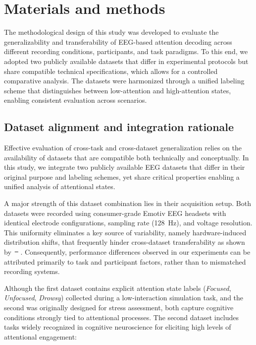 \documentclass[10pt,letterpaper]{article}
\makeatletter
\providecommand{\DIFaddtex}[1]{{\protect\color{blue}\uwave{#1}}} %
\providecommand{\DIFdeltex}[1]{{\protect\color{red}\sout{#1}}} %
\providecommand{\DIFaddbegin}{} %
\providecommand{\DIFaddend}{} %
\providecommand{\DIFdelbegin}{} %
\providecommand{\DIFdelend}{} %
\providecommand{\DIFadd}[1]{\texorpdfstring{\DIFaddtex{#1}}{#1}} %
\providecommand{\DIFdel}[1]{\texorpdfstring{\DIFdeltex{#1}}{}} %
\providecommand{\DIFscaledelfig}{0.5}
\newlength{\DIFdelgraphicswidth} %
\newlength{\DIFdelgraphicsheight} %
\providecommand{\DIFaddincludegraphics}[2][]{{\color{blue}\fbox{\DIFOincludegraphics[#1]{#2}}}} %
\providecommand{\DIFdelincludegraphics}[2][]{%
\sbox{\DIFdelgraphicsbox}{\DIFOincludegraphics[#1]{#2}}%
\settoboxwidth{\DIFdelgraphicswidth}{\DIFdelgraphicsbox} %
\settoboxtotalheight{\DIFdelgraphicsheight}{\DIFdelgraphicsbox} %
\scalebox{\DIFscaledelfig}{%
\parbox[b]{\DIFdelgraphicswidth}{\usebox{\DIFdelgraphicsbox}\\[-\baselineskip] \rule{\DIFdelgraphicswidth}{0em}}\llap{\resizebox{\DIFdelgraphicswidth}{\DIFdelgraphicsheight}{%
\setlength{\unitlength}{\DIFdelgraphicswidth}%
\begin{picture}(1,1)%
\thicklines\linethickness{2pt} %
{\color[rgb]{1,0,0}\put(0,0){\framebox(1,1){}}}%
{\color[rgb]{1,0,0}\put(0,0){\line( 1,1){1}}}%
{\color[rgb]{1,0,0}\put(0,1){\line(1,-1){1}}}%
\end{picture}%
}\hspace*{3pt}}} %
} %
\DeclareRobustCommand{\DIFaddbegin}{\DIFOaddbegin \let\includegraphics\DIFaddincludegraphics} %
\DeclareRobustCommand{\DIFaddend}{\DIFOaddend \let\includegraphics\DIFOincludegraphics} %
\DeclareRobustCommand{\DIFdelbegin}{\DIFOdelbegin \let\includegraphics\DIFdelincludegraphics} %
\DeclareRobustCommand{\DIFdelend}{\DIFOaddend \let\includegraphics\DIFOincludegraphics} %
\let\sout@orig\sout %
\renewcommand{\sout}[1]{\ifmmode\text{\sout@orig{\ensuremath{#1}}}\else\sout@orig{#1}\fi} %
\makeatother
\begin{document}
\section*{Materials and methods}

The methodological design of this study was developed to evaluate the generalizability and transferability of EEG-based attention decoding across different recording conditions, participants, and task paradigms. To this end, we adopted two publicly available datasets that differ in experimental protocols but share compatible technical specifications, which allows for a controlled comparative analysis. The datasets were harmonized through a unified labeling scheme that distinguishes between low-attention and high-attention states, enabling consistent evaluation across scenarios.

\subsection*{Dataset alignment and integration rationale}

Effective evaluation of cross-task and cross-dataset generalization relies on the availability of datasets that are compatible both technically and conceptually. In this study, we integrate two publicly available EEG datasets that differ in their original purpose and labeling schemes, yet share critical properties enabling a unified analysis of attentional states.

A major strength of this dataset combination lies in their acquisition setup. Both datasets were recorded using consumer-grade Emotiv EEG headsets with identical electrode configurations, sampling rate (128~Hz), and voltage resolution. This uniformity eliminates a key source of variability, namely hardware-induced distribution shifts, that frequently hinder cross-dataset transferability as shown by~\DIFdelbegin \DIFdel{\mbox{%
\cite{li2020domain}}\hskip0pt%
}\DIFdelend \DIFaddbegin \DIFadd{\mbox{%
\cite{lan2019domain}}\hskip0pt%
}\DIFaddend . Consequently, performance differences observed in our experiments can be attributed primarily to task and participant factors, rather than to mismatched recording systems.

Although the first dataset contains explicit attention state labels (\textit{Focused}, \textit{Unfocused}, \textit{Drowsy}) collected during a low-interaction simulation task, and the second was originally designed for stress assessment, both capture cognitive conditions strongly tied to attentional processes. The second dataset includes tasks widely recognized in cognitive neuroscience for eliciting high levels of attentional engagement:
\end{document}
